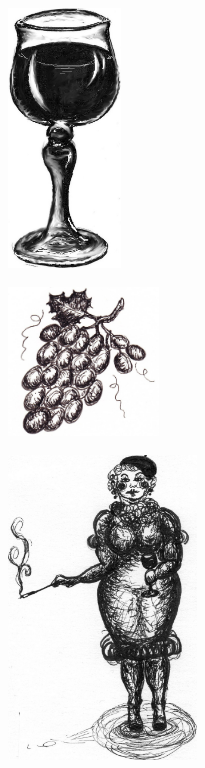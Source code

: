 \clearpage

\begin{figure}[!b]
\begin{center}
\includegraphics[width=3cm]{../bilder/vinglas.jpg} 
\end{center}
\end{figure}
\clearpage

\clearpage

\clearpage


\clearpage

\begin{figure}[!b]
\begin{center}
\includegraphics[width=4cm]{../bilder/druvor.jpg} 
\end{center}
\end{figure}
\clearpage

\begin{figure}[!b]
\begin{center}
\includegraphics[width=50mm]{../bilder/fetfransyska.jpg} 
\end{center}
\end{figure}
\clearpage


\clearpage

